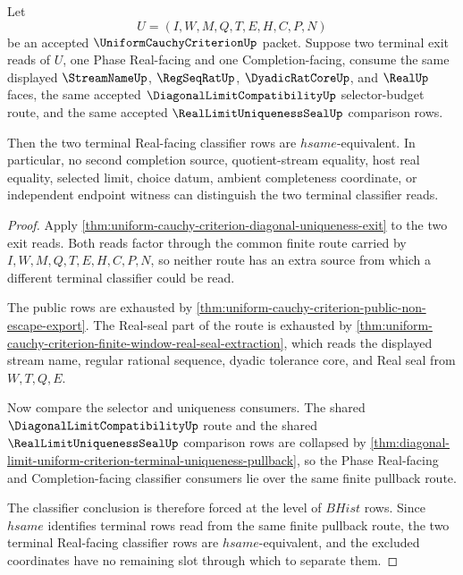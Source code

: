 \begin{theorem}
\label{thm:uniform-cauchy-criterion-diagonal-exit-classifier}
Let
$$
U=(I,W,M,Q,T,E,H,C,P,N)
$$
be an accepted $\UniformCauchyCriterionUp$ packet. Suppose two terminal exit reads of $U$, one Phase Real-facing and one Completion-facing, consume the same displayed $\StreamNameUp$, $\RegSeqRatUp$, $\DyadicRatCoreUp$, and $\RealUp$ faces, the same accepted $\DiagonalLimitCompatibilityUp$ selector-budget route, and the same accepted $\RealLimitUniquenessSealUp$ comparison rows.

Then the two terminal Real-facing classifier rows are $hsame$-equivalent. In particular, no second completion source, quotient-stream equality, host real equality, selected limit, choice datum, ambient completeness coordinate, or independent endpoint witness can distinguish the two terminal classifier reads.
\end{theorem}
\begin{proof}
Apply \autoref{thm:uniform-cauchy-criterion-diagonal-uniqueness-exit} to the two exit reads. Both reads factor through the common finite route carried by $I,W,M,Q,T,E,H,C,P,N$, so neither route has an extra source from which a different terminal classifier could be read.

The public rows are exhausted by \autoref{thm:uniform-cauchy-criterion-public-non-escape-export}. The Real-seal part of the route is exhausted by \autoref{thm:uniform-cauchy-criterion-finite-window-real-seal-extraction}, which reads the displayed stream name, regular rational sequence, dyadic tolerance core, and Real seal from $W,T,Q,E$.

Now compare the selector and uniqueness consumers. The shared $\DiagonalLimitCompatibilityUp$ route and the shared $\RealLimitUniquenessSealUp$ comparison rows are collapsed by \autoref{thm:diagonal-limit-uniform-criterion-terminal-uniqueness-pullback}, so the Phase Real-facing and Completion-facing classifier consumers lie over the same finite pullback route.

The classifier conclusion is therefore forced at the level of $BHist$ rows. Since $hsame$ identifies terminal rows read from the same finite pullback route, the two terminal Real-facing classifier rows are $hsame$-equivalent, and the excluded coordinates have no remaining slot through which to separate them.
\end{proof}

